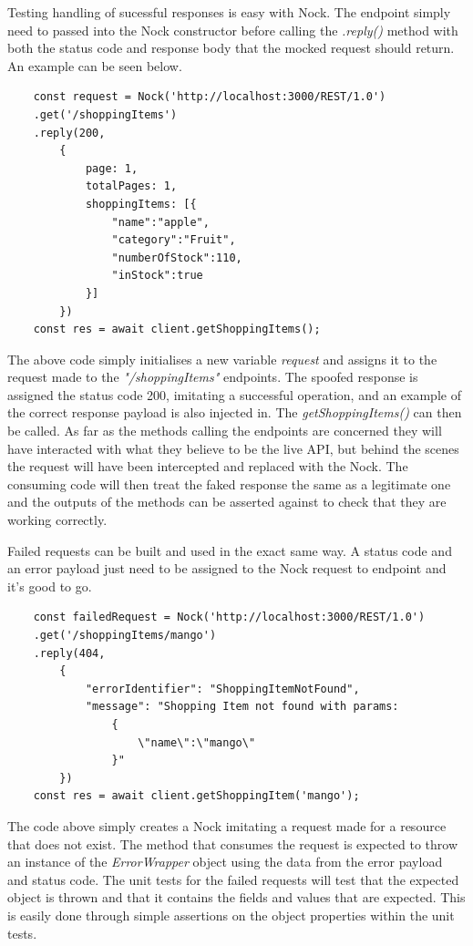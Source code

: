 Testing handling of sucessful responses is easy with Nock. The endpoint simply need to passed into the Nock constructor before calling the \textit{.reply()} method with both the status code and response body that the mocked request should return. An example can be seen below.
\begin{verbatim}
    const request = Nock('http://localhost:3000/REST/1.0')
    .get('/shoppingItems') 
    .reply(200,
        {
            page: 1,
            totalPages: 1,
            shoppingItems: [{
                "name":"apple",
                "category":"Fruit",
                "numberOfStock":110,
                "inStock":true
            }]
        })
    const res = await client.getShoppingItems();
\end{verbatim}
The above code simply initialises a new variable \textit{request} and assigns it to the request made to the \textit{"/shoppingItems"} endpoints. The spoofed response is assigned the status code 200, imitating a successful operation, and an example of the correct response payload is also injected in. The \textit{getShoppingItems()} can then be called. As far as the methods calling the endpoints are concerned they will have interacted with what they believe to be the live API, but behind the scenes the request will have been intercepted and replaced with the Nock. The consuming code will then treat the faked response the same as a legitimate one and the outputs of the methods can be asserted against to check that they are working correctly.

Failed requests can be built and used in the exact same way. A status code and an error payload just need to be assigned to the Nock request to endpoint and it's good to go.
\begin{verbatim}
    const failedRequest = Nock('http://localhost:3000/REST/1.0')
    .get('/shoppingItems/mango')
    .reply(404, 
        {
            "errorIdentifier": "ShoppingItemNotFound",
            "message": "Shopping Item not found with params: 
                {
                    \"name\":\"mango\"
                }"
        })
    const res = await client.getShoppingItem('mango');
\end{verbatim}
The code above simply creates a Nock imitating a request made for a resource that does not exist. The method that consumes the request is expected to throw an instance of the \textit{ErrorWrapper} object using the data from the error payload and status code. The unit tests for the failed requests will test that the expected object is thrown and that it contains the fields and values that are expected. This is easily done through simple assertions on the object properties within the unit tests.

